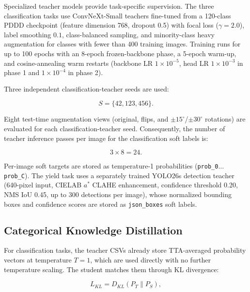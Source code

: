 \documentclass[preprint,12pt]{elsarticle}
\begin{document}
Specialized teacher models provide task-specific supervision. The three
classification tasks use ConvNeXt-Small teachers fine-tuned from a
120-class PDDD checkpoint (feature dimension 768, dropout 0.5) with
focal loss ($\gamma=2.0$), label smoothing $0.1$, class-balanced
sampling, and minority-class heavy augmentation for classes with fewer
than 400 training images. Training runs for up to 100 epochs with an
8-epoch frozen-backbone phase, a 5-epoch warm-up, and cosine-annealing
warm restarts (backbone LR $1\times10^{-5}$, head LR $1\times10^{-3}$
in phase 1 and $1\times10^{-4}$ in phase 2).

Three independent classification-teacher seeds are used:

\begin{equation}
S=\{42,123,456\}.
\end{equation}

Eight test-time augmentation views (original, flips, and
$\pm15^{\circ}$/$\pm30^{\circ}$ rotations) are evaluated for each
classification-teacher seed. Consequently, the number of teacher
inference passes per image for the classification soft labels is:

\begin{equation}
3\times8=24.
\end{equation}

Per-image soft targets are stored as temperature-1 probabilities
(\texttt{prob\_0}$\ldots$\texttt{prob\_C}). The yield task uses a
separately trained YOLO26s detection teacher (640-pixel input, CIELAB
$a^{*}$ CLAHE enhancement, confidence threshold 0.20, NMS IoU 0.45, up
to 300 detections per image), whose normalized bounding boxes and
confidence scores are stored as \texttt{json\_boxes} soft labels.


\subsection{Categorical Knowledge Distillation}

For classification tasks, the teacher CSVs already store TTA-averaged
probability vectors at temperature $T=1$, which are used directly with
no further temperature scaling. The student matches them through KL
divergence:

\begin{equation}
L_{KL}
=
D_{KL}
\left(
P_T
\parallel
P_S
\right),
\end{equation}
\end{document}
